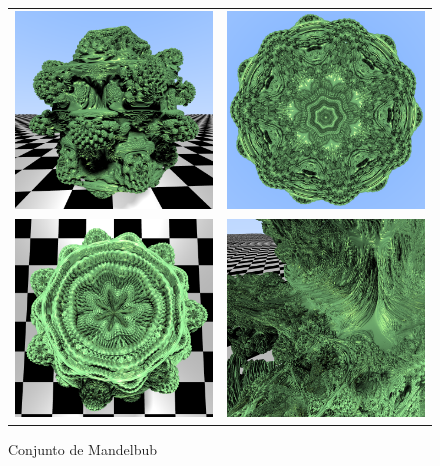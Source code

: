 \begin{figure}[ht]
    \centering
    \begin{tabular}{cc}
        \includegraphics[width=6.5cm]{img/C9/mandelbub-1.png} &
      \includegraphics[width=6.5cm]{img/C9/mandelbub-2.png} \\    
    \includegraphics[width=6.5cm]{img/C9/mandelbub-3.png} &     \includegraphics[width=6.5cm]{img/C9/mandelbub-4.png} \\
    \end{tabular}
    \caption{Conjunto de Mandelbub}
    \label{fig:mandelbub}
\end{figure}


